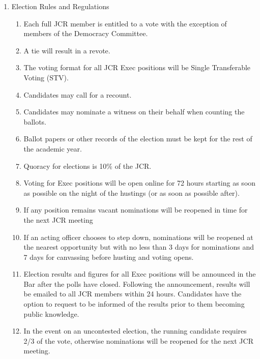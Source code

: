 \begin{enumerate}
\begin{enumerate}
    \end{enumerate}
    \item Election Rules and Regulations
    \begin{enumerate}
        \item Each full JCR member is entitled to a vote with the exception of members of the Democracy Committee.
        \item A tie will result in a revote.
        \item The voting format for all JCR Exec positions will be Single Transferable Voting (STV). 
        \item Candidates may call for a recount.
        \item Candidates may nominate a witness on their behalf when counting the ballots.
        \item Ballot papers or other records of the election must be kept for the rest of the academic year.
        \item Quoracy for elections is 10\% of the JCR.
        \item Voting for Exec positions will be open online for 72 hours starting as soon as possible on the night of the hustings (or as soon as possible after).
        \item If any position remains vacant nominations will be reopened in time for the next JCR meeting
        \item If an acting officer chooses to step down, nominations will be reopened at the nearest opportunity but with no less than 3 days for nominations and 7 days for canvassing before husting and voting opens.
        \label{it:Reopen Election}
        \item Election results and figures for all Exec positions will be announced in the Bar after the polls have closed. Following the announcement, results will be emailed to all JCR members within 24 hours. Candidates have the option to request to be informed of the results prior to them becoming public knowledge.
        \item In the event on an uncontested election, the running candidate requires 2/3 of the vote, otherwise nominations will be reopened for the next JCR meeting.
    \end{enumerate}
\end{enumerate}

